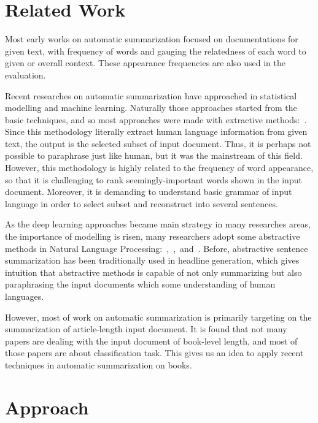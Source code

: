 \section{Related Work}
Most early works on 
automatic summarization focused on documentations for given text, with 
frequency of words and gauging the relatedness of each word to given or overall
context. These appearance frequencies are also used in the evaluation.

Recent researches on automatic summarization have approached in statistical
modelling and machine learning. Naturally those approaches started from the
basic techniques, and so most approaches were made with extractive
methods:~\cite{2017arXiv170804439V}. Since this methodology literally extract
human language information from given text, the output is the selected subset
of input document. Thus, it is perhaps not possible to paraphrase just like
human, but it was the mainstream of this field. However, this methodology is
highly related to the frequency of word appearance, so that it is challenging
to rank seemingly-important words shown in the input document. Moreover, it is
demanding to understand basic grammar of input language in order to select
subset and reconstruct into several sentences.

As the deep learning approaches became main strategy in many researches areas,
the importance of modelling is risen, many researchers adopt some abstractive
methods in Natural Language
Processing:~\cite{2016arXiv160206023N},~\cite{2017arXiv170404368S},~and~\cite{Rush2015}.
Before, abstractive sentence summarization has been traditionally used in
headline generation, which gives intuition that abstractive methods is capable
of not only summarizing but also paraphrasing the input documents which some
understanding of human languages. 

However, most of work on automatic summarization is primarily targeting on
the summarization of article-length input document. It is found that not many
papers are dealing with the input document of book-level length, and most of
those papers are about classification task. This gives us an idea to apply
recent techniques in automatic summarization on books.


\section{Approach}

